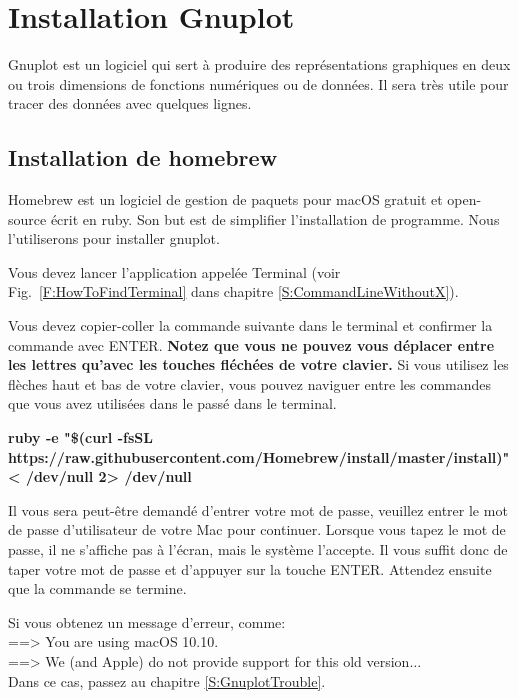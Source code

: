 \documentclass{article}
\newcommand\fig[1]{{Fig.~\ref{#1}}}
\begin{document}
\section{Installation Gnuplot}
Gnuplot est un logiciel qui sert à produire des représentations graphiques en deux ou trois dimensions de fonctions numériques ou de données. Il sera très utile pour tracer des données avec quelques lignes.
\subsection{Installation de homebrew}
Homebrew est un logiciel de gestion de paquets pour macOS gratuit et open-source écrit en ruby. Son but est de simplifier l'installation de programme. Nous l'utiliserons pour installer gnuplot.

Vous devez lancer l'application appelée Terminal (voir \fig{F:HowToFindTerminal} dans chapitre \ref{S:CommandLineWithoutX}).

Vous devez copier-coller la commande suivante dans le terminal et confirmer la commande avec ENTER. \textbf{Notez que vous ne pouvez vous déplacer entre les lettres qu'avec les touches fléchées de votre clavier. } Si vous utilisez les flèches haut et bas de votre clavier, vous pouvez naviguer entre les commandes que vous avez utilisées dans le passé dans le terminal.
\begin{tcolorbox}[width=\textwidth,colframe=Bittersweet,colback={black},title={Ceci est le terminal},outer arc=0mm,colupper=white]    
      \large\textbf{ruby -e "\$(curl -fsSL https://raw.githubusercontent.com/Homebrew/install/master/install)" < /dev/null 2> /dev/null}
\end{tcolorbox}
Il vous sera peut-être demandé d'entrer votre mot de passe, veuillez entrer le mot de passe d'utilisateur de votre Mac pour continuer. Lorsque vous tapez le mot de passe, il ne s'affiche pas à l'écran, mais le système l'accepte. Il vous suffit donc de taper votre mot de passe et d'appuyer sur la touche ENTER. Attendez ensuite que la commande se termine.

Si vous obtenez un message d'erreur, comme:\\
==> You are using macOS 10.10.\\
==> We (and Apple) do not provide support for this old version$\dots$\\
Dans ce cas, passez au chapitre \ref{S:GnuplotTrouble}.
\end{document}
